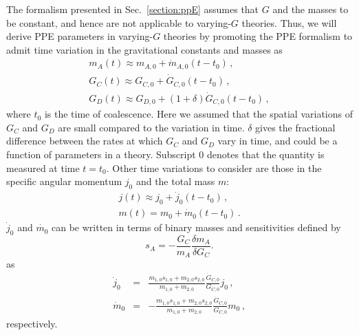 \documentclass[prd,twocolumn,nofootinbib]{revtex4-1}
\newcommand\ba{\begin{eqnarray}}
\newcommand\ea{\end{eqnarray}}
\begin{document}
The formalism presented in Sec.~\ref{section:ppE} assumes that $G$ and the masses to be constant, and hence are not applicable to varying-$G$ theories. Thus, we will derive PPE parameters in varying-$G$ theories by promoting the PPE formalism to admit time variation in the gravitational constants and masses as
 \begin{eqnarray}\label{eq:3.7a2}
 m_A(t)\approx m_{A,0}+\dot{m}_{A,0}(t-t_0)\,, \\
   \label{eq:3.7a4}  G_C(t)\approx  G_{C,0}+\dot{G}_{C,0}(t-t_0)\,, \\
   \label{eq:3.7a4-2}  G_D(t)\approx  G_{D,0}+(1+\delta)\dot{G}_{C,0}(t-t_0)\, , 
 \end{eqnarray}
where $t_0$ is the time of coalescence. Here we assumed that the spatial variations of $G_C$ and $G_D$ are small compared to the variation in time. $\delta$ gives the fractional difference between the rates at which $G_C$ and $G_D$ vary in time, and could be a function of parameters in a theory. Subscript $0$ denotes that the quantity is measured at time $t=t_0$. 
%
Other time variations to consider are those in the specific angular momentum $j_0$ and the total mass $m$:
\ba
\label{eq:3.7a3-2}  j(t)\approx j_0+\dot{j}_0(t-t_0)\,, \\
m(t)=m_0+\dot{m}_0(t-t_0)\,.
 \ea
$\dot{j}_0$ and $\dot{m_0}$ can be written in terms of binary masses and sensitivities defined by
\begin{equation}
s_A=-\frac{G_C}{m_A}\frac{\delta m_A}{\delta G_C}.
\end{equation}
as~\cite{PhysRevLett.65.953}
\begin{eqnarray}\label{eq:3.7a4-3}
\dot{j}_0&=&\frac{m_{1,0}s_{1,0}+m_{2,0}s_{2,0}}{m_{1,0}+m_{2,0}}\frac{\dot{G}_{C,0}}{G_{C,0}}j_0\,, \\
\label{eq:3.7a4-4}
\dot{m}_0&=&-\frac{m_{1,0}s_{1,0}+m_{2,0}s_{2,0}}{m_{1,0}+m_{2,0}}\frac{\dot{G}_{C,0}}{G_{C,0}}m_0\,,
\end{eqnarray}
respectively. 
\end{document}
